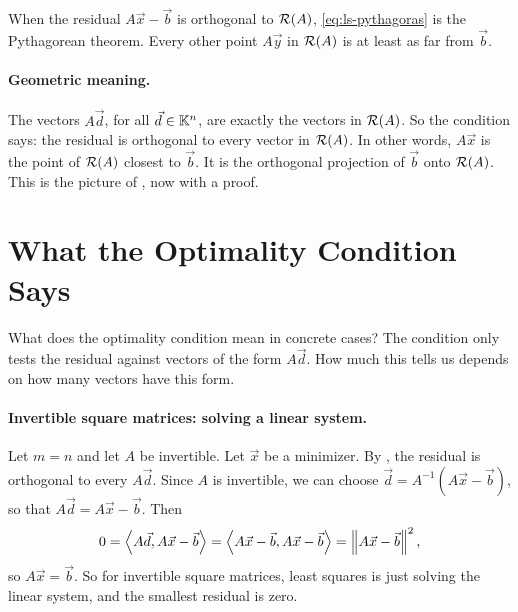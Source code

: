 \begin{center}

\small When the residual $A\vec{x} - \vec{b}$ is orthogonal to $\mathcal{R}(A)$, \eqref{eq:ls-pythagoras} is the Pythagorean theorem. Every other point $A\vec{y}$ in $\mathcal{R}(A)$ is at least as far from $\vec{b}$.
\end{center}

\paragraph{Geometric meaning.} The vectors $A\vec{d}$, for all $\vec{d} \in \mathbb{K}^n$, are exactly the vectors in $\mathcal{R}(A)$. So the condition says: the residual is orthogonal to every vector in $\mathcal{R}(A)$. In other words, $A\vec{x}$ is the point of $\mathcal{R}(A)$ closest to $\vec{b}$. It is the orthogonal projection of $\vec{b}$ onto $\mathcal{R}(A)$. This is the picture of , now with a proof.

\section{What the Optimality Condition Says}

What does the optimality condition mean in concrete cases? The condition only tests the residual against vectors of the form $A\vec{d}$. How much this tells us depends on how many vectors have this form.

\paragraph{Invertible square matrices: solving a linear system.} Let $m = n$ and let $A$ be invertible. Let $\vec{x}$ be a minimizer. By , the residual is orthogonal to every $A\vec{d}$. Since $A$ is invertible, we can choose $\vec{d} = A^{-1}(A\vec{x} - \vec{b})$, so that $A\vec{d} = A\vec{x} - \vec{b}$. Then
\begin{equation}
  0 = \left\langle A\vec{d}, A\vec{x} - \vec{b} \right\rangle = \left\langle A\vec{x} - \vec{b}, A\vec{x} - \vec{b} \right\rangle = \left\lVert A\vec{x} - \vec{b} \right\rVert^2,
\end{equation}
so $A\vec{x} = \vec{b}$. So for invertible square matrices, least squares is just solving the linear system, and the smallest residual is zero.

